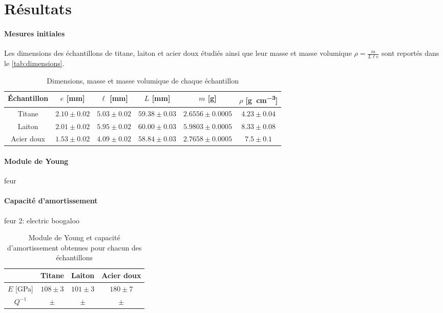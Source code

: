 \section{Résultats}

\paragraph{Mesures initiales} Les dimensions des échantillons de titane, laiton et acier doux étudiés ainsi que leur masse et masse volumique \(\rho = \frac{m}{L \ell e}\) sont reportés dans le \autoref{tab:dimensions}.

\begin{table}[h]
    \centering
    \begin{tabulary}{0.7\linewidth}{c|c c c c c}
        \toprule
        Échantillon & \(e\) [\si{\milli\meter}] & \(\ell\) [\si{\milli\meter}] & \(L\) [\si{\milli\meter}] & \(m\) [\si{\gram}] & \(\rho\) [\si{\gram\per\cubic\centi\meter}] \\
        \midrule
        Titane & \(2.10 \pm 0.02\) & \(5.03 \pm 0.02\) & \(59.38 \pm 0.03\) & \(2.6556 \pm 0.0005\) & \(4.23 \pm 0.04\) \\
        Laiton & \(2.01 \pm 0.02\) & \(5.95 \pm 0.02\) & \(60.00 \pm 0.03\) & \(5.9803 \pm 0.0005\) & \(8.33 \pm 0.08\) \\
        Acier doux & \(1.53 \pm 0.02\) & \(4.09 \pm 0.02\) & \(58.84 \pm 0.03\) & \(2.7658 \pm 0.0005\) & \(7.5 \pm 0.1\) \\
        \bottomrule
    \end{tabulary}
    \caption{Dimensions, masse et masse volumique de chaque échantillon}
    \label{tab:dimensions}
\end{table}

\paragraph{Module de Young} feur

\paragraph{Capacité d'amortissement} feur 2: electric boogaloo

\begin{table}[h]
    \centering
    \begin{tabulary}{0.7\linewidth}{c|C C C}
        \toprule
        & Titane & Laiton & Acier doux \\
        \midrule
        \(E\) [\si{\giga\pascal}] & \(108 \pm 3\) & \(101 \pm 3\) & \(180 \pm 7\) \\
        \(Q^{-1}\) & \(\pm\) & \(\pm\) & \(\pm\) \\
        \bottomrule
    \end{tabulary}
    \caption{Module de Young et capacité d'amortissement obtenues pour chacun des échantillons}
    \label{tab:young_amortissement}
\end{table}

